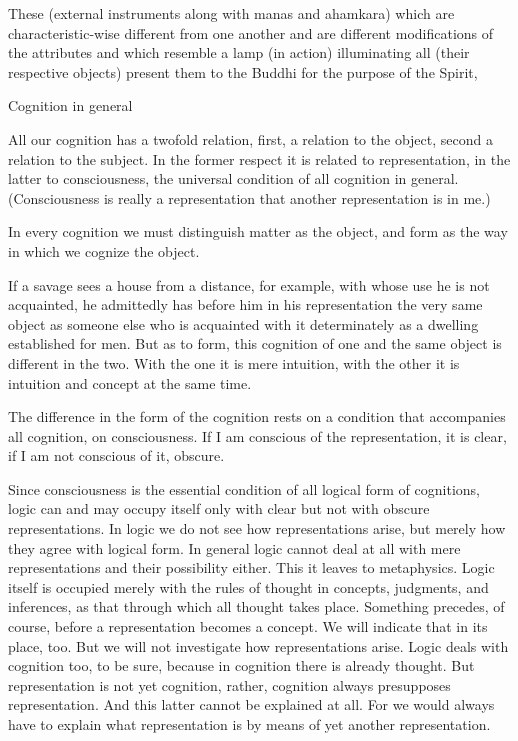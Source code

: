 These (external instruments along with manas and ahamkara)
which are characteristic-wise different from one another
and are different modifications of the attributes
and which resemble a lamp (in action) illuminating all (their respective objects)
present them to the Buddhi for the purpose of the Spirit,

Cognition in general

All our cognition has a twofold relation,
first, a relation to the object,
second a relation to the subject.
In the former respect it is related to representation,
in the latter to consciousness,
the universal condition of all cognition in general.
(Consciousness is really a representation that
another representation is in me.)

In every cognition we must distinguish
matter as the object, and form as the way in which we cognize the object.

    If a savage sees a house from a distance, for example,
    with whose use he is not acquainted, he admittedly
    has before him in his representation the very same object as
    someone else who is acquainted with it determinately
    as a dwelling established for men.
    But as to form, this cognition of one and the same object is different in the two.
    With the one it is mere intuition,
    with the other it is intuition and concept at the same time.

The difference in the form of the cognition rests on
a condition that accompanies all cognition, on consciousness.
If I am conscious of the representation, it is clear,
if I am not conscious of it, obscure.

    Since consciousness is the essential condition of
    all logical form of cognitions,
    logic can and may occupy itself only
    with clear but not with obscure representations.
    In logic we do not see how representations arise,
    but merely how they agree with logical form.
    In general logic cannot deal at all with
    mere representations and their possibility either.
    This it leaves to metaphysics.
    Logic itself is occupied merely with the rules of thought in
    concepts, judgments, and inferences,
    as that through which all thought takes place.
    Something precedes, of course, before a representation becomes a concept.
    We will indicate that in its place, too.
    But we will not investigate how representations arise.
    Logic deals with cognition too, to be sure,
    because in cognition there is already thought.
    But representation is not yet cognition, rather,
    cognition always presupposes representation.
    And this latter cannot be explained at all.
    For we would always have to explain what representation is
    by means of yet another representation.

